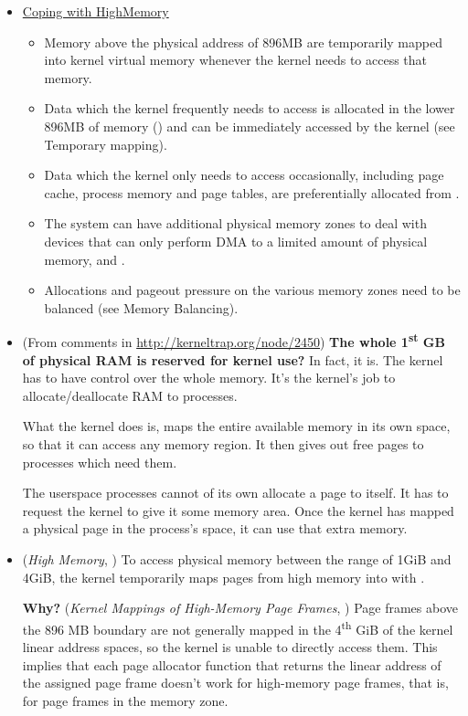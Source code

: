 \begin{itemize}
\item \href{http://linux-mm.org/HighMemory}{Coping with HighMemory}
  \begin{itemize}
  \item Memory above the physical address of 896MB are temporarily mapped into kernel
    virtual memory whenever the kernel needs to access that memory.
  \item Data which the kernel frequently needs to access is allocated in the lower 896MB
    of memory () and can be immediately accessed by the kernel (see
    Temporary mapping).
  \item Data which the kernel only needs to access occasionally, including page cache,
    process memory and page tables, are preferentially allocated from
    .
  \item The system can have additional physical memory zones to deal with devices that can
    only perform DMA to a limited amount of physical memory,  and
    .
  \item Allocations and pageout pressure on the various memory zones need to be balanced
    (see Memory Balancing).
  \end{itemize}
\item (From comments in \href{High Memory In The Linux
    Kernel}{http://kerneltrap.org/node/2450}) \textbf{The whole 1\textsuperscript{st} GB
    of physical RAM is reserved for kernel use?} In fact, it is. The kernel has to have
  control over the whole memory. It's the kernel's job to allocate/deallocate RAM to
  processes.

  What the kernel does is, maps the entire available memory in its own space, so that it
  can access any memory region. It then gives out free pages to processes which need them.

  The userspace processes cannot of its own allocate a page to itself. It has to request
  the kernel to give it some memory area. Once the kernel has mapped a physical page in
  the process's space, it can use that extra memory.
\item (\emph{High Memory}, \cite[Sec 2.5]{gorman2004understanding}) To access physical
  memory between the range of 1GiB and 4GiB, the kernel temporarily maps pages from high
  memory into  with .

  \textbf{Why?} (\emph{Kernel Mappings of High-Memory Page Frames}, \cite[Sec
  8.1.6]{bovet2005understanding}) Page frames above the 896 MB boundary are not generally
  mapped in the 4\textsuperscript{th} GiB of the kernel linear address spaces, so the
  kernel is unable to directly access them. This implies that each page allocator function
  that returns the linear address of the assigned page frame doesn't work for high-memory
  page frames, that is, for page frames in the  memory zone.


\end{itemize}
